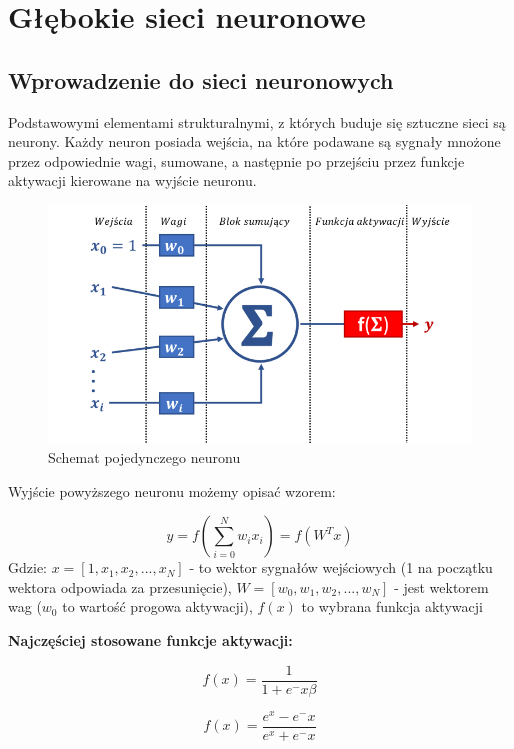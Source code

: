 \section{Głębokie sieci neuronowe}
\subsection{Wprowadzenie do sieci neuronowych}

Podstawowymi elementami strukturalnymi, z których buduje się sztuczne sieci 
są neurony. Każdy neuron posiada wejścia, na które podawane są 
sygnały mnożone przez odpowiednie wagi, sumowane, a następnie po przejściu przez 
funkcje aktywacji kierowane na wyjście neuronu. 


\begin{figure}[H]
	\centering
	\includegraphics[width=12cm]{pages/teoria/zdjecia/sztucznyNeuron.jpg}
	\caption{Schemat pojedynczego neuronu \cite{sztucznyNeuron}}
	\label{rys:ogolnyRozwiazania}
\end{figure}


Wyjście powyższego neuronu możemy opisać wzorem:

\begin{equation}
	y = f( \sum_{i = 0}^{N}w_i x_i) = f(W^T x)
	\label{eq:rownanieNeuronu}
\end{equation}
Gdzie: $x=[1, x_1, x_2, ..., x_N]$ - to wektor sygnałów wejściowych (1 na początku wektora odpowiada
za przesunięcie), $W = [w_0, w_1, w_2, ..., w_N]$ - jest wektorem wag ($w_0$ to wartość progowa aktywacji),
$f(x)$ to wybrana funkcja aktywacji

\textbf{Najczęściej stosowane funkcje aktywacji:}

\begin{equation}
	f(x) = \frac{1}{1 + e^-x\beta} 
	\label{eq:signum}
\end{equation}

\begin{equation}
	f(x) = \frac{e^x - e^-x}{e^x + e^-x}
	\label{eq:tangensHiperboliczny}
\end{equation}

